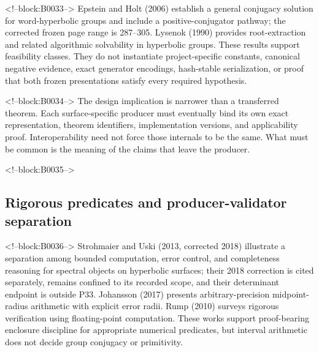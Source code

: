 \documentclass[11pt,a4paper]{article}
\begin{document}
<!--block:B0033-->
Epstein and Holt (2006)
\citep{P33-S12}
 establish a general conjugacy solution for word-hyperbolic groups and include a positive-conjugator pathway; the corrected frozen page range is 287--305. Lysenok (1990)
\citep{P33-S13}
 provides root-extraction and related algorithmic solvability in hyperbolic groups. These results support feasibility classes. They do not instantiate project-specific constants, canonical negative evidence, exact generator encodings, hash-stable serialization, or proof that both frozen presentations satisfy every required hypothesis.

<!--block:B0034-->
The design implication is narrower than a transferred theorem. Each surface-specific producer must eventually bind its own exact representation, theorem identifiers, implementation versions, and applicability proof. Interoperability need not force those internals to be the same. What must be common is the meaning of the claims that leave the producer.

<!--block:B0035-->
\hypertarget{rigorous-predicates-and-producer-validator-separation}{%
\subsection{Rigorous predicates and producer-validator separation}\label{rigorous-predicates-and-producer-validator-separation}}

<!--block:B0036-->
Strohmaier and Uski (2013, corrected 2018)
\citep{P33-S16,P33-S16-CORR}
 illustrate a separation among bounded computation, error control, and completeness reasoning for spectral objects on hyperbolic surfaces; their 2018 correction is cited separately, remains confined to its recorded scope, and their determinant endpoint is outside P33. Johansson (2017)
\citep{P33-S17}
 presents arbitrary-precision midpoint-radius arithmetic with explicit error radii. Rump (2010)
\citep{P33-S18}
 surveys rigorous verification using floating-point computation. These works support proof-bearing enclosure discipline for appropriate numerical predicates, but interval arithmetic does not decide group conjugacy or primitivity.
\end{document}
